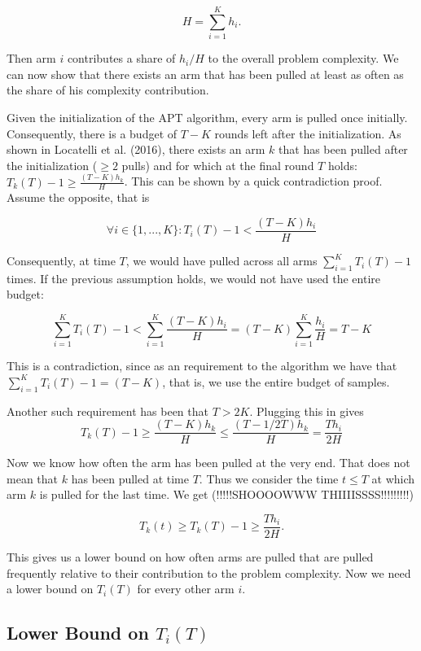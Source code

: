 \documentclass[12pt,]{article}
\begin{document}
\[
H = \sum_{i = 1}^{K} h_i.
\]

Then arm \(i\) contributes a share of \(h_i/H\) to the overall problem
complexity. We can now show that there exists an arm that has been
pulled at least as often as the share of his complexity contribution.

Given the initialization of the APT algorithm, every arm is pulled once
initially. Consequently, there is a budget of \(T-K\) rounds left after
the initialization. As shown in Locatelli et al. (2016), there exists an
arm \(k\) that has been pulled after the initialization (\(\geq 2\)
pulls) and for which at the final round \(T\) holds:
\(T_k(T) - 1 \geq \frac{(T-K)h_k}{H}\). This can be shown by a quick
contradiction proof. Assume the opposite, that is

\[
\forall i \in \{1,...,K\}: T_i(T) - 1 < \frac{(T-K)h_i}{H}
\]

Consequently, at time \(T\), we would have pulled across all arms
\(\sum_{i=1}^KT_i(T)-1\) times. If the previous assumption holds, we
would not have used the entire budget:

\[
\sum_{i=1}^K T_i(T)-1 < \sum_{i=1}^K \frac{(T-K)h_i}{H} = (T-K)\sum_{i=1}^K \frac{h_i}{H} = T-K
\]

This is a contradiction, since as an requirement to the algorithm we
have that \(\sum_{i=1}^K T_i(T)-1 = (T-K)\), that is, we use the entire
budget of samples.

Another such requirement has been that \(T>2K\). Plugging this in gives
\[
T_k(T) - 1 \geq \frac{(T-K)h_k}{H} \leq \frac{(T-1/2T)h_k}{H} = \frac{Th_i}{2H}
\]

Now we know how often the arm has been pulled at the very end. That does
not mean that \(k\) has been pulled at time \(T\). Thus we consider the
time \(t \leq T\) at which arm \(k\) is pulled for the last time. We get
(!!!!!SHOOOOWWW THIIIISSSS!!!!!!!!!)

\[
T_k(t) \geq T_k(T) - 1 \geq \frac{Th_i}{2H}.
\]

This gives us a lower bound on how often arms are pulled that are pulled
frequently relative to their contribution to the problem complexity. Now
we need a lower bound on \(T_i(T)\) for every other arm \(i\).

\subsection{\texorpdfstring{Lower Bound on
\(T_i(T)\)}{Lower Bound on T\_i(T)}}\label{lower-bound-on-t_it}
\end{document}
